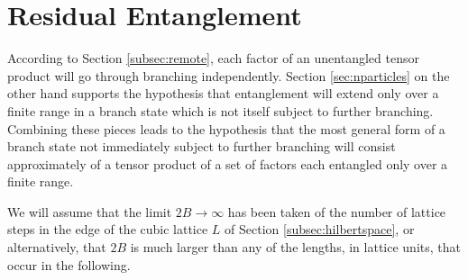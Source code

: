 \documentclass[twocolumn,amsmath,amssymb]{revtex4-1}
\begin{document}
\section{\label{sec:residual} Residual Entanglement}

According to Section \ref{subsec:remote},
each factor of an unentangled tensor product will go through branching
independently. Section \ref{sec:nparticles}
on the other hand supports the hypothesis 
that entanglement will extend only over
a finite range in a branch state which is not itself subject to further
branching. Combining these pieces leads to the hypothesis that
the most general form of a branch state not immediately subject to
further branching will consist approximately of a tensor
product of a set of factors each entangled only over a finite range.

We will assume that the limit $2 B \rightarrow \infty$ has been
taken of the number of lattice steps in the edge
of the cubic lattice $L$ of Section \ref{subsec:hilbertspace}, or
alternatively, that $2 B$ is much larger than any of the
lengths, in lattice units, that occur in the following.
\end{document}

